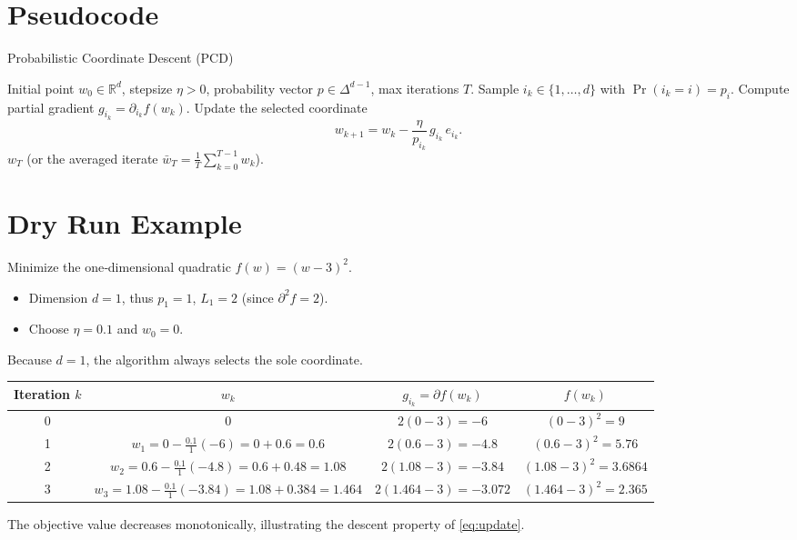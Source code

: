 \documentclass{article}
\begin{document}
\section*{Pseudocode}
\begin{algorithm}[H]
\caption{Probabilistic Coordinate Descent (PCD)}
\begin{algorithmic}[1]
\Require Initial point $w_0\in\mathbb{R}^{d}$, stepsize $\eta>0$, probability vector $p\in\Delta^{d-1}$, max iterations $T$.
    \State Sample $i_k\in\{1,\dots,d\}$ with $\Pr(i_k=i)=p_i$.
    \State Compute partial gradient $g_{i_k}= \partial_{i_k}f(w_k)$.
    \State Update the selected coordinate
    \[
    w_{k+1}= w_k-\frac{\eta}{p_{i_k}}\, g_{i_k}\,e_{i_k}.
    \]
\EndFor
\State \Return $w_T$ (or the averaged iterate $\bar w_T=\frac1T\sum_{k=0}^{T-1}w_k$).
\end{algorithmic}
\end{algorithm}

\section*{Dry Run Example}
Minimize the one‑dimensional quadratic $f(w)=(w-3)^2$.
\begin{itemize}
    \item Dimension $d=1$, thus $p_1=1$, $L_1=2$ (since $\partial^2 f=2$).
    \item Choose $\eta=0.1$ and $w_0=0$.
\end{itemize}
Because $d=1$, the algorithm always selects the sole coordinate.

\begin{center}
\begin{tabular}{c|c|c|c}
Iteration $k$ & $w_k$ & $g_{i_k}= \partial f(w_k)$ & $f(w_k)$\\ \hline
0 & $0$ & $2(0-3)=-6$ &
$(0-3)^2=9$\\
1 & $w_1 = 0-\frac{0.1}{1}(-6)=0+0.6=0.6$ &
$2(0.6-3)=-4.8$ &
$(0.6-3)^2=5.76$\\
2 & $w_2 = 0.6-\frac{0.1}{1}(-4.8)=0.6+0.48=1.08$ &
$2(1.08-3)=-3.84$ &
$(1.08-3)^2=3.6864$\\
3 & $w_3 = 1.08-\frac{0.1}{1}(-3.84)=1.08+0.384=1.464$ &
$2(1.464-3)=-3.072$ &
$(1.464-3)^2=2.365$\\
\end{tabular}
\end{center}
The objective value decreases monotonically, illustrating the descent property of \eqref{eq:update}.
\end{document}
